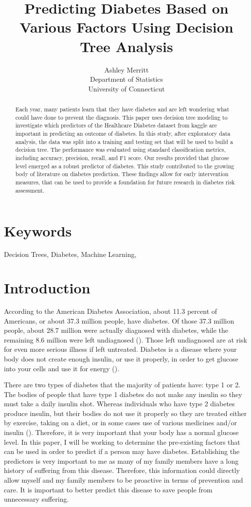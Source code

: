 \documentclass[12pt]{article}
\title{Predicting Diabetes Based on Various Factors Using Decision Tree Analysis}
\author{Ashley Merritt\\
    Department of Statistics\\
    University of Connecticut
    }
\begin{document}
\maketitle

\begin{abstract}
Each year, many patients learn that they have diabetes and are left wondering what could have done to prevent the diagnosis. This
paper uses decision tree modeling to investigate which predictors of the Healthcare Diabetes dataset from kaggle are important in predicting 
an outcome of diabetes. In this study, after exploratory data analysis, the data was split into a training and testing set
that will be used to build a decision tree. The performance was evaluated using standard classification metrics, including accuracy, precision, 
recall, and F1 score. Our results provided that glucose level emerged as a robust predictor of diabetes. This study contributed to the growing body of
literature on diabetes prediction. These findings allow for early intervention measures, that can be used to provide a foundation for future research in diabetes
risk assessment.
\end{abstract}

\section*{Keywords}
Decision Trees, Diabetes, Machine Learning, 

\section{Introduction}
\label{sec:intro}
    According to the American Diabetes Association, about 11.3 percent of Americans, or about 37.3 million people, have diabetes.
    Of those 37.3 million people, about 28.7 million were actually diagnosed with diabetes, while the remaining 8.6 million were
    left undiagnosed (\citet{CDC2022Diabetes}). Those left undiagnosed are at risk for even more serious illness if left untreated. 
    Diabetes is a disease where your body does not create enough insulin, or use it properly, in order to get glucose into your cells 
    and use it for energy (\cite{NIH2023Whatis}).
    
    There are two types of diabetes that the majority of patients have: type 1 or 2. The bodies of people that have type 1 diabetes do not make any insulin so they must take a daily insulin shot. Whereas individuals who have type 2 diabetes produce insulin, but 
    their bodies do not use it properly so they are treated either by exercise, taking on a diet, or in some cases use of various medicines and/or insulin (\cite{JDC2023Difference}). 
    Therefore, it is very important that your body has a normal glucose level. In this paper, I will be working to determine the pre-existing
    factors that can be used in order to predict if a person may have diabetes. Establishing the predictors is very important to me as many of
    my family members have a long history of suffering from this disease. Therefore, this information could directly allow myself and my family members to be
    proactive in terms of prevention and care. It is important to better predict this disease to save people from unnecessary suffering. 
\end{document}
